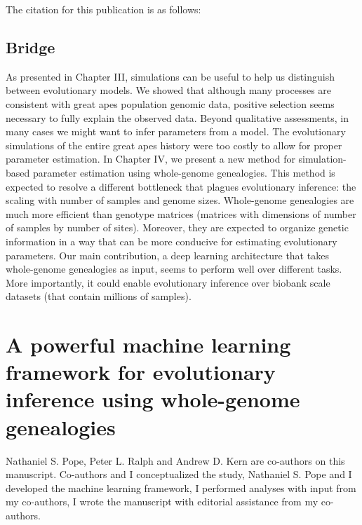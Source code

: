 \bigskip
The citation for this publication is as follows:

\bigskip



\newpage
\section{Bridge}

As presented in Chapter III, simulations can be useful to help us distinguish between evolutionary models.
We showed that although many processes are consistent with great apes population genomic data,
positive selection seems necessary to fully explain the observed data.
Beyond qualitative assessments, in many cases we might want to infer parameters from a model.
The evolutionary simulations of the entire great apes history were too costly to allow for proper parameter estimation.
In Chapter IV, we present a new method for simulation-based parameter estimation using whole-genome genealogies.
This method is expected to resolve a different bottleneck that plagues evolutionary inference: the scaling with number of samples and genome sizes.
Whole-genome genealogies are much more efficient than genotype matrices (matrices with dimensions of number of samples by number of sites).
Moreover, they are expected to organize genetic information in a way that can be more conducive for estimating evolutionary parameters.
Our main contribution, a deep learning architecture that takes whole-genome genealogies as input, seems to perform well over different tasks.
More importantly, it could enable evolutionary inference over biobank scale datasets (that contain millions of samples).

\chapter{A powerful machine learning framework for evolutionary inference using whole-genome genealogies} \label{chapter:tsnn}

\bigskip
Nathaniel S. Pope, Peter L. Ralph and Andrew D. Kern are co-authors on this manuscript.
Co-authors and I conceptualized the study,
Nathaniel S. Pope and I developed the machine learning framework,
I performed analyses with input from my co-authors,
I wrote the manuscript with editorial assistance from my co-authors.\\
\bigskip










